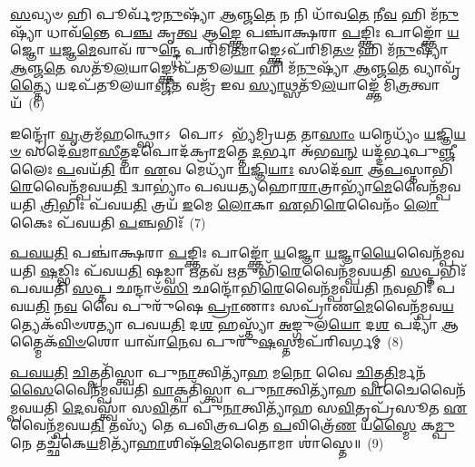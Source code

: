 \-\ul{𑌸}\-𑌵𑍍𑌯𑍞 𑌹𑌿 𑌪𑍂𑌰𑍍𑌵᳴𑌮𑍍𑌮\-\ul{𑌨𑍁}\-𑌷𑍍𑌯𑌾᳴ \ul{𑌆}\-𑌞𑍍𑌜\-\ul{𑌤𑍇} 𑌨 𑌨𑌿 𑌧𑌾᳴𑌵\-\ul{𑌤𑍇} 𑌨𑍀\-\ul{𑌵} 𑌹𑌿 𑌮᳴\-\ul{𑌨𑍁}\-𑌷𑍍𑌯𑌾᳴ 𑌧𑌾𑌵᳴\-\ul{𑌨𑍍𑌤𑍇} 𑌪\-\ul{𑌞𑍍𑌚} 𑌕𑍃\-\ul{𑌤𑍍𑌵} 𑌆\-\ul{𑌙𑍍𑌕𑍍𑌤𑍇} 𑌪𑌞𑍍𑌚𑌾॑𑌕𑍍𑌷𑌰𑌾 \ul{𑌪}\-𑌙𑍍𑌕𑍍𑌤𑌿𑌃 𑌪𑌾𑌙𑍍𑌕𑍍𑌤𑍋᳴ \ul{𑌯}\-𑌜𑍍𑌞𑍋 \ul{𑌯}\-𑌜𑍍𑌞\-\ul{𑌮𑍇}\-𑌵𑌾𑌵᳴ 𑌰𑍁\-\ul{𑌨𑍍𑌦𑍍𑌧𑍇} 𑌪𑌰𑌿᳴𑌮𑌿\-\ul{𑌤}\-𑌮𑌾𑌙𑍍𑌕𑍍𑌤𑍇\-𑌽𑌪᳴𑌰𑌿𑌮𑌿\-\ul{𑌤}\-\-\ul{𑍞} 𑌹𑌿 𑌮᳴\-\ul{𑌨𑍁}\-𑌷𑍍𑌯𑌾᳴ \ul{𑌆}\-𑌞𑍍𑌜\-\ul{𑌤𑍇} 𑌸𑌤𑍂᳴\-\ul{𑌲}\-𑌯𑌾𑌙𑍍𑌕𑍍𑌤𑍇\-𑌽𑌪᳴𑌤𑍂𑌲\-\ul{𑌯𑌾} 𑌹𑌿 𑌮᳴\-\ul{𑌨𑍁}\-𑌷𑍍𑌯𑌾᳴ \ul{𑌆}\-𑌞𑍍𑌜\-\ul{𑌤𑍇} 𑌵𑍍𑌯𑌾𑌵𑍃᳴\-\ul{𑌤𑍍𑌤𑍍𑌯𑍈} 𑌯𑌦𑌪᳴𑌤𑍂𑌲𑌯𑌾\-\ul{𑌞𑍍𑌜𑍀}\-𑌤 𑌵𑌜𑍍𑌰᳴ 𑌇𑌵 \ul{𑌸𑍍𑌯𑌾}\-𑌥𑍍𑌸𑌤𑍂᳴\-\ul{𑌲}\-𑌯𑌾𑌙𑍍𑌕𑍍𑌤𑍇᳴ 𑌮𑌿\-\ul{𑌤𑍍𑌰}\-𑌤𑍍𑌵𑌾𑌯᳴~(6)

𑌇𑌨𑍍𑌦𑍍𑌰𑍋᳴ \ul{𑌵𑍃}\-𑌤𑍍𑌰𑌮᳴\-\ul{𑌹}\-𑌨𑍍𑌥𑍍𑌸𑍋\-𑌽 𑌪𑍋\-𑌽 𑌭𑍍𑌯᳴𑌮𑍍𑌰𑌿𑌯\-\ul{𑌤} 𑌤𑌾\-\ul{𑌸𑌾𑌂} 𑌯𑌨𑍍𑌮𑍇𑌧𑍍𑌯𑌂᳴ \ul{𑌯}\-𑌜𑍍𑌞𑌿\-\ul{𑌯}\-\-\ul{𑍞} 𑌸𑌦𑍇᳴\-\ul{𑌵}\-𑌮𑌾\-\ul{𑌸𑍀}\-𑌤𑍍𑌤𑌦𑌪𑍋𑌦᳴𑌕𑍍𑌰𑌾\-\ul{𑌮}\-𑌤𑍍𑌤𑍇 \ul{𑌦}\-𑌰𑍍𑌭𑌾 𑌅᳴𑌭\-\ul{𑌵}\-\-\ul{𑌨𑍍} 𑌯𑌦𑍍𑌦᳴𑌰𑍍𑌭𑌪𑍁\-\ul{𑌞𑍍𑌜𑍀}\-𑌲𑍈𑌃 \ul{𑌪}\-𑌵𑌯᳴\-\ul{𑌤𑌿} 𑌯𑌾 \ul{𑌏}\-𑌵 𑌮𑍇𑌧𑍍𑌯𑌾᳴ \ul{𑌯}\-𑌜𑍍𑌞𑌿\-\ul{𑌯𑌾𑌃} 𑌸𑌦𑍇᳴\-\ul{𑌵𑌾} 𑌆\-\ul{𑌪}\-𑌸𑍍𑌤𑌾𑌭𑌿᳴\-\ul{𑌰𑍇}\-𑌵𑍈𑌨᳴𑌮𑍍𑌪𑌵𑌯\-\ul{𑌤𑌿} 𑌦𑍍𑌵𑌾\-𑌭𑍍𑌯𑌾𑌂॑ 𑌪𑌵𑌯𑌤𑍍𑌯𑌹𑍋\-\ul{𑌰𑌾}\-𑌤𑍍𑌰𑌾𑌭𑍍𑌯𑌾᳴\-\ul{𑌮𑍇}\-𑌵𑍈𑌨᳴𑌮𑍍𑌪𑌵𑌯𑌤𑌿 \ul{𑌤𑍍𑌰𑌿}\-𑌭𑌿𑌃 𑌪᳴𑌵𑌯\-\ul{𑌤𑌿} 𑌤𑍍𑌰𑌯᳴ \ul{𑌇}\-𑌮𑍇 \ul{𑌲𑍋}\-𑌕𑌾 \ul{𑌏}\-𑌭𑌿\-\ul{𑌰𑍇}\-𑌵𑍈𑌨𑌂᳴ \ul{𑌲𑍋}\-𑌕𑍈𑌃 𑌪᳴𑌵𑌯𑌤𑌿 \ul{𑌪}\-𑌞𑍍𑌚𑌭𑌿𑌃᳴~(7)

\-\ul{𑌪}\-\-\ul{𑌵}\-\-\ul{𑌯}\-\-\ul{𑌤𑌿} 𑌪𑌞𑍍𑌚𑌾॑𑌕𑍍𑌷𑌰𑌾 \ul{𑌪}\-𑌙𑍍𑌕𑍍𑌤𑌿𑌃 𑌪𑌾𑌙𑍍𑌕𑍍𑌤𑍋᳴ \ul{𑌯}\-𑌜𑍍𑌞𑍋 \ul{𑌯}\-𑌜𑍍𑌞𑌾\-\ul{𑌯𑍈}\-𑌵𑍈𑌨᳴𑌮𑍍𑌪𑌵𑌯𑌤𑌿 \ul{𑌷}\-𑌡𑍍𑌭𑌿𑌃 𑌪᳴𑌵𑌯\-\ul{𑌤𑌿} 𑌷𑌡𑍍𑌵𑌾 \ul{𑌋}\-𑌤𑌵᳴ \ul{𑌋}\-𑌤𑍁𑌭𑌿᳴\-\ul{𑌰𑍇}\-𑌵𑍈𑌨᳴𑌮𑍍𑌪𑌵𑌯𑌤𑌿 \ul{𑌸}\-𑌪𑍍𑌤𑌭𑌿𑌃᳴ 𑌪𑌵𑌯𑌤𑌿 \ul{𑌸}\-𑌪𑍍𑌤 𑌛𑌨𑍍𑌦𑌾𑍞᳴\-\ul{𑌸𑌿} 𑌛𑌨𑍍𑌦𑍋᳴𑌭𑌿\-\ul{𑌰𑍇}\-𑌵𑍈𑌨᳴𑌮𑍍𑌪𑌵𑌯𑌤𑌿 \ul{𑌨}\-𑌵𑌭𑌿𑌃᳴ 𑌪𑌵𑌯\-\ul{𑌤𑌿} 𑌨\-\ul{𑌵} 𑌵𑍈 𑌪𑍁𑌰𑍁᳴𑌷𑍇 \ul{𑌪𑍍𑌰𑌾}\-𑌣𑌾𑌃 𑌸𑌪𑍍𑌰𑌾᳴𑌣\-\ul{𑌮𑍇}\-𑌵𑍈𑌨᳴𑌮𑍍𑌪𑌵\-\-\ul{𑌯}\-𑌤𑍍𑌯𑍇𑌕᳴𑌵𑌿𑍞𑌶𑌤𑍍𑌯𑌾 𑌪𑌵𑌯\-\ul{𑌤𑌿} 𑌦\-\ul{𑌶} 𑌹𑌸𑍍𑌤𑍍𑌯𑌾᳴ \ul{𑌅}\-𑌙𑍍𑌗𑍁𑌲᳴\-\ul{𑌯𑍋} 𑌦\-\ul{𑌶} 𑌪𑌦𑍍𑌯𑌾᳴ \ul{𑌆}\-𑌤𑍍𑌮𑍈𑌕᳴\-\ul{𑌵𑌿}\-\-\ul{𑍞}\-𑌶𑍋 𑌯𑌾𑌵𑌾᳴\-\ul{𑌨𑍇}\-𑌵 𑌪𑍁𑌰𑍁᳴\-\ul{𑌷}\-𑌸𑍍𑌤𑌮𑌪᳴𑌰𑌿𑌵𑌰𑍍𑌗𑌮𑍍~(8)

\-\ul{𑌪}\-\-\ul{𑌵}\-\-\ul{𑌯}\-\-\ul{𑌤𑌿} \ul{𑌚𑌿}\-𑌤𑍍𑌪𑌤𑌿᳴𑌸𑍍𑌤𑍍𑌵𑌾 𑌪𑍁\-\ul{𑌨𑌾}\-𑌤𑍍𑌵𑌿𑌤𑍍𑌯𑌾᳴\-\ul{𑌹} 𑌮\-\ul{𑌨𑍋} 𑌵𑍈 \ul{𑌚𑌿}\-𑌤𑍍𑌪\-\ul{𑌤𑌿}\-𑌰𑍍𑌮𑌨᳴\-\ul{𑌸𑍈}\-𑌵𑍈𑌨᳴𑌮𑍍𑌪𑌵𑌯𑌤𑌿 \ul{𑌵𑌾}\-𑌕𑍍𑌪𑌤𑌿᳴𑌸𑍍𑌤𑍍𑌵𑌾 𑌪𑍁\-\ul{𑌨𑌾}\-𑌤𑍍𑌵𑌿𑌤𑍍𑌯𑌾᳴𑌹 \ul{𑌵𑌾}\-𑌚𑍈𑌵𑍈𑌨᳴𑌮𑍍𑌪𑌵𑌯𑌤𑌿 \ul{𑌦𑍇}\-𑌵𑌸𑍍𑌤𑍍𑌵𑌾᳴ 𑌸\-\ul{𑌵𑌿}\-𑌤𑌾 𑌪𑍁᳴\-\ul{𑌨𑌾}\-𑌤𑍍𑌵𑌿𑌤𑍍𑌯𑌾᳴𑌹 𑌸\-\ul{𑌵𑌿}\-𑌤𑍃𑌪𑍍𑌰᳴𑌸𑍂𑌤 \ul{𑌏}\-𑌵𑍈𑌨᳴𑌮𑍍𑌪𑌵𑌯\-\ul{𑌤𑌿} 𑌤𑌸𑍍𑌯᳴ 𑌤𑍇 𑌪𑌵𑌿𑌤𑍍𑌰𑌪𑌤𑍇 \ul{𑌪}\-𑌵𑌿𑌤𑍍𑌰𑍇᳴\-\ul{𑌣} 𑌯\-\ul{𑌸𑍍𑌮𑍈} 𑌕\-\ul{𑌮𑍍𑌪𑍁}\-𑌨𑍇 𑌤𑌚𑍍𑌛᳴𑌕𑍇\-\ul{𑌯}\-𑌮𑌿𑌤𑍍𑌯𑌾᳴\-\ul{𑌹𑌾}\-𑌶𑌿𑌷᳴\-\ul{𑌮𑍇}\-𑌵𑍈𑌤𑌾𑌮𑌾 𑌶𑌾॑𑌸𑍍𑌤𑍇॥~(9)

{\anuvakamend[{\-\ul{𑌅}\-\-\ul{𑌤𑍀}\-\-\ul{𑌕𑌾}\-𑌶𑌾𑌨𑍍𑌕᳴\-\ul{𑌰𑍋}\-𑌤𑍍𑌯𑌵𑍇᳴𑌶𑌯\-\ul{𑌨𑍍𑌤𑍀}\-𑌰𑍍𑌥𑍇 𑌸𑍍𑌨𑌾᳴𑌤𑌿 𑌪𑍍𑌰\-\ul{𑌘𑌾}\-𑌤𑍋 𑌮᳴\-\ul{𑌨𑍁}\-𑌷𑍍𑌯𑌾᳴\-\ul{𑌣𑌾}\-𑌨𑍍𑌤𑌦𑍍𑌵𑌾 𑌆𑌙𑍍𑌕𑍍𑌤𑍇᳴ 𑌮𑌿\-\ul{𑌤𑍍𑌰}\-𑌤𑍍𑌵𑌾𑌯᳴ \ul{𑌪}\-𑌞𑍍𑌚\-\ul{𑌭𑌿}\-𑌰𑌪᳴𑌰𑌿𑌵𑌰𑍍𑌗\-\ul{𑌮}\-𑌷𑍍𑌟𑌾𑌚᳴𑌤𑍍𑌵𑌾𑌰𑌿𑍞𑌶𑌚𑍍𑌚}]}%


